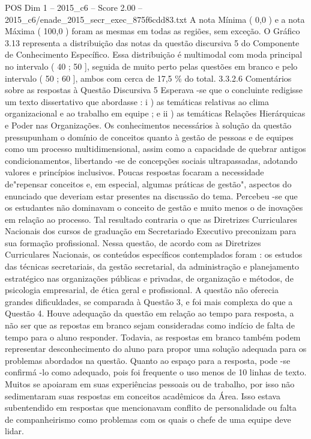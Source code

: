 \begin{textsample}{POS Dim 1 – 2015\_c6 – Score 2.00 – 2015\_c6/enade\_2015\_secr\_exec\_875f6cdd83.txt}
A nota Mínima ( 0,0 ) e a nota Máxima ( 100,0 ) foram as mesmas em todas as regiões, sem exceção.
O Gráfico 3.13 representa a distribuição das notas da questão discursiva 5 do Componente de Conhecimento Específico.
Essa distribuição é multimodal com moda principal no intervalo ( 40 ; 50 ], seguida de muito perto pelas questões em branco e pelo intervalo ( 50 ; 60 ], ambos com cerca de 17,5 \% do total. 3.3.2.6 Comentários sobre as respostas à Questão Discursiva 5 Esperava -se que o concluinte redigisse um texto dissertativo que abordasse : i ) as temáticas relativas ao clima organizacional e ao trabalho em equipe ; e ii ) as temáticas Relações Hierárquicas e Poder nas Organizações.
Os conhecimentos necessários à solução da questão pressupunham o domínio de conceitos quanto à gestão de pessoas e de equipes como um processo multidimensional, assim como a capacidade de quebrar antigos condicionamentos, libertando -se de concepções sociais ultrapassadas, adotando valores e princípios inclusivos.
Poucas respostas focaram a necessidade de"repensar conceitos e, em especial, algumas práticas de gestão", aspectos do enunciado que deveriam estar presentes na discussão do tema.
Percebeu -se que os estudantes não dominavam o conceito de gestão e muito menos o de inovações em relação ao processo.
Tal resultado contraria o que as Diretrizes Curriculares Nacionais dos cursos de graduação em Secretariado Executivo preconizam para sua formação profissional.
Nessa questão, de acordo com as Diretrizes Curriculares Nacionais, os conteúdos específicos contemplados foram : os estudos das técnicas secretariais, da gestão secretarial, da administração e planejamento estratégico nas organizações públicas e privadas, de organização e métodos, de psicologia empresarial, de ética geral e profissional.
A questão não oferecia grandes dificuldades, se comparada à Questão 3, e foi mais complexa do que a Questão 4.
Houve adequação da questão em relação ao tempo para resposta, a não ser que as repostas em branco sejam consideradas como indício de falta de tempo para o aluno responder.
Todavia, as respostas em branco também podem representar desconhecimento do aluno para propor uma solução adequada para os problemas abordados na questão.
Quanto ao espaço para a resposta, pode -se confirmá -lo como adequado, pois foi frequente o uso menos de 10 linhas de texto.
Muitos se apoiaram em suas experiências pessoais ou de trabalho, por isso não sedimentaram suas respostas em conceitos acadêmicos da Área.
Isso estava subentendido em respostas que mencionavam conflito de personalidade ou falta de companheirismo como problemas com os quais o chefe de uma equipe deve lidar.

\end{textsample}
